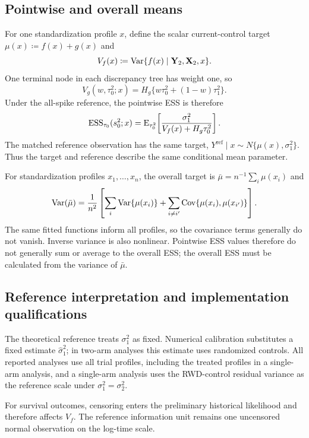 \subsection{Pointwise and overall means}\label{sec:B.6}
For one standardization profile $x$, define the scalar current-control target $\mu(x)\coloneqq f(x)+g(x)$ and
\[
V_f(x)\coloneqq
\operatorname{Var}\{f(x)\mid\mathbf Y_2,\mathbf X_2,x\}.
\]
One terminal node in each discrepancy tree has weight one, so
\[
V_g(w,\tau_0^2;x)
=H_g\{w\tau_0^2+(1-w)\tau_1^2\}.
\]
Under the all-spike reference, the pointwise ESS is therefore
\[
\operatorname{ESS}_{\tau_0}(s_0^2;x)
=\operatorname{E}_{\tau_0^2}\!\left[
\frac{\sigma_1^2}{V_f(x)+H_g\tau_0^2}
\right].
\]
The matched reference observation has the same target, $Y^{\mathrm{ref}}\mid x\sim N\{\mu(x),\sigma_1^2\}$. Thus the target and reference describe the same conditional mean parameter.

For standardization profiles $x_1,\ldots,x_n$, the overall target is $\bar\mu=n^{-1}\sum_i\mu(x_i)$ and
\begin{equation}\label{eq:nonadd}
\operatorname{Var}(\bar\mu)
=\frac1{n^2}\left[
\sum_i\operatorname{Var}\{\mu(x_i)\}
+\sum_{i\ne i'}\operatorname{Cov}\{\mu(x_i),\mu(x_{i'})\}
\right].
\end{equation}
The same fitted functions inform all profiles, so the covariance terms generally do not vanish. Inverse variance is also nonlinear. Pointwise ESS values therefore do not generally sum or average to the overall ESS; the overall ESS must be calculated from the variance of $\bar\mu$.

\subsection{Reference interpretation and implementation qualifications}\label{sec:B.7}
The theoretical reference treats $\sigma_1^2$ as fixed. Numerical calibration substitutes a fixed estimate $\widehat\sigma_1^2$; in two-arm analyses this estimate uses randomized controls. All reported analyses use all trial profiles, including the treated profiles in a single-arm analysis, and a single-arm analysis uses the RWD-control residual variance as the reference scale under $\sigma_1^2=\sigma_2^2$.

For survival outcomes, censoring enters the preliminary historical likelihood and therefore affects $V_f$. The reference information unit remains one uncensored normal observation on the log-time scale.

